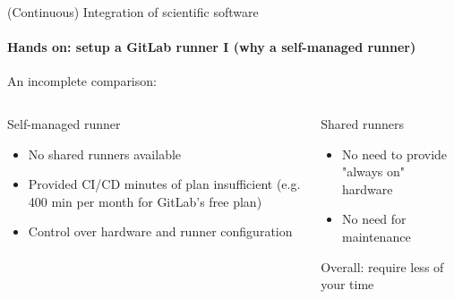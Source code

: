 \begin{frame}{(Continuous) Integration of scientific software}
    \framesubtitle{Hands on: setup a GitLab runner I (why a self-managed runner)}
    An incomplete comparison:
    \begin{columns}
        \begin{column}{0.48\textwidth}
            \begin{exampleblock}{Self-managed runner}
                \begin{itemize}
                    \item No shared runners available
                    \item Provided CI/CD minutes of plan insufficient (e.g. 400 min per month for GitLab's free plan)
                    \item Control over hardware and runner configuration
                \end{itemize}
            \end{exampleblock}
        \end{column}

        \begin{column}{0.48\textwidth}
            \begin{block}{Shared runners}
                \begin{itemize}
                    \item No need to provide "always on" hardware
                    \item No need for maintenance
                \end{itemize}
                Overall: require less of your time
            \end{block}
        \end{column}
    \end{columns}
\end{frame}


